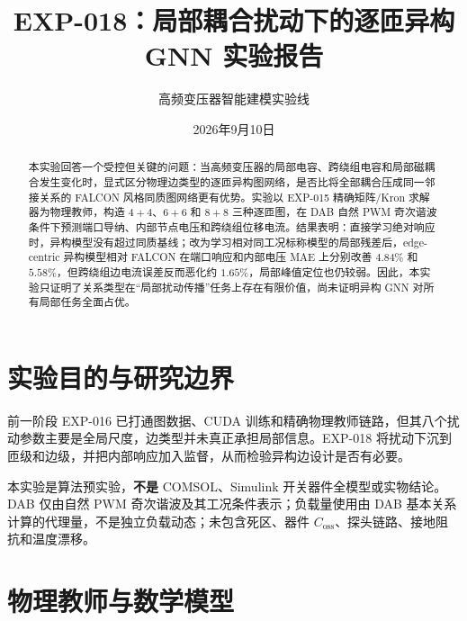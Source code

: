 \documentclass[11pt,a4paper]{ctexart}
\title{EXP-018：局部耦合扰动下的逐匝异构 GNN 实验报告}
\author{高频变压器智能建模实验线}
\date{2026年9月10日}
\begin{document}
\maketitle
\begin{abstract}
本实验回答一个受控但关键的问题：当高频变压器的局部电容、跨绕组电容和局部磁耦合发生变化时，显式区分物理边类型的逐匝异构图网络，是否比将全部耦合压成同一邻接关系的 FALCON 风格同质图网络更有优势。实验以 EXP-015 精确矩阵/Kron 求解器为物理教师，构造 $4+4$、$6+6$ 和 $8+8$ 三种逐匝图，在 DAB 自然 PWM 奇次谐波条件下预测端口导纳、内部节点电压和跨绕组位移电流。结果表明：直接学习绝对响应时，异构模型没有超过同质基线；改为学习相对同工况标称模型的局部残差后，edge-centric 异构模型相对 FALCON 在端口响应和内部电压 MAE 上分别改善 $4.84\%$ 和 $5.58\%$，但跨绕组边电流误差反而恶化约 $1.65\%$，局部峰值定位也仍较弱。因此，本实验只证明了关系类型在“局部扰动传播”任务上存在有限价值，尚未证明异构 GNN 对所有局部任务全面占优。
\end{abstract}

\section{实验目的与研究边界}
前一阶段 EXP-016 已打通图数据、CUDA 训练和精确物理教师链路，但其八个扰动参数主要是全局尺度，边类型并未真正承担局部信息。EXP-018 将扰动下沉到匝级和边级，并把内部响应加入监督，从而检验异构边设计是否有必要。

本实验是算法预实验，\textbf{不是} COMSOL、Simulink 开关器件全模型或实物结论。DAB 仅由自然 PWM 奇次谐波及其工况条件表示；负载量使用由 DAB 基本关系计算的代理量，不是独立负载动态；未包含死区、器件 $C_{\mathrm{oss}}$、探头链路、接地阻抗和温度漂移。

\section{物理教师与数学模型}
\end{document}
